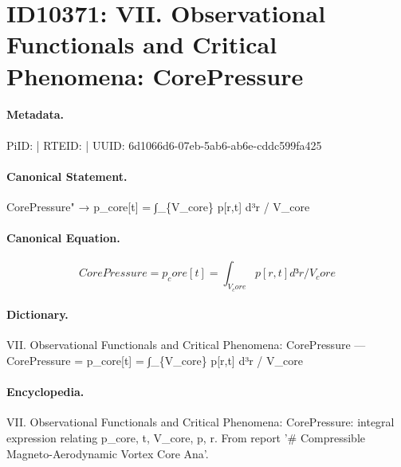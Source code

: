 \section*{ID10371: VII. Observational Functionals and Critical Phenomena: CorePressure}
\paragraph{Metadata.}
PiID:  | RTEID:  | UUID: 6d1066d6-07eb-5ab6-ab6e-cddc599fa425

\paragraph{Canonical Statement.}
CorePressure" → p\_core[t] = ∫\_\{V\_core\} p[r,t] d³r / V\_core

\paragraph{Canonical Equation.}
\[
CorePressure = p_core[t] = ∫_{V_core} p[r,t] d³r / V_core
\]

\paragraph{Dictionary.}
VII. Observational Functionals and Critical Phenomena: CorePressure — CorePressure = p\_core[t] = ∫\_\{V\_core\} p[r,t] d³r / V\_core

\paragraph{Encyclopedia.}
VII. Observational Functionals and Critical Phenomena: CorePressure: integral expression relating p\_core, t, V\_core, p, r. From report '\# Compressible Magneto-Aerodynamic Vortex Core Ana'.
